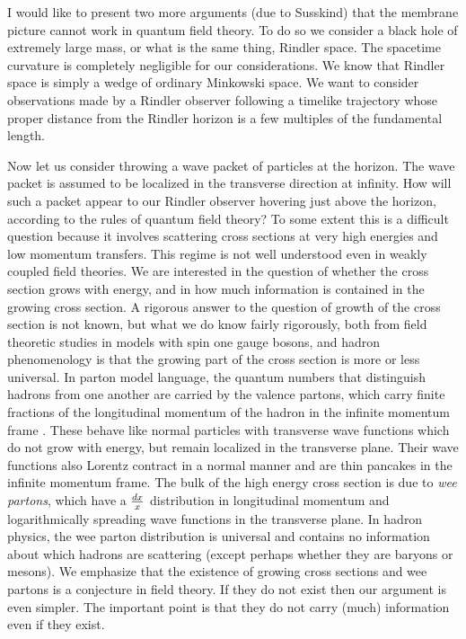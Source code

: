 I would like to present two more
arguments (due to Susskind) that the membrane picture cannot work in quantum
field
theory.  To do so we consider a black hole of extremely large mass, or what is
the same thing, Rindler space.  The spacetime curvature is completely
negligible for
our considerations.  We know that Rindler space is simply a wedge of ordinary
Minkowski space.  We want to consider observations made by a Rindler observer
following
a timelike trajectory whose proper distance from the Rindler horizon is a few
multiples of
the fundamental length.

Now let us consider throwing a wave packet of particles at the horizon.  The
wave packet
is assumed to be localized in the transverse direction at infinity.  How will
such a packet
appear to our Rindler observer hovering just above the horizon, according to
the rules of
quantum field theory?  To some extent this is a difficult question because it
involves
scattering cross sections at very high energies and low momentum transfers.
This
regime is not well understood even in weakly coupled field theories.
We are interested
in the question of whether the cross section grows with energy, and in how
much information
is contained in the growing cross section.  A rigorous answer to the question
of
growth of the cross section is not known, but what we do know fairly
rigorously, both from
field theoretic studies in models with spin one gauge bosons,
and hadron phenomenology is that the growing part of the cross section is more or
less
universal.  In parton model language, the quantum numbers that distinguish
hadrons from
one another are carried by the valence partons, which carry finite fractions
of the longitudinal momentum of the hadron in the infinite momentum frame
.
These behave like normal
particles with transverse wave functions which do not grow with energy, but
remain localized in the
transverse plane.  Their wave functions also Lorentz contract in a normal
manner and are thin pancakes
in the infinite momentum frame. The bulk of the high energy cross section is
due to {\it wee partons}, which have
a ${dx\over x}$ distribution in longitudinal momentum and logarithmically
spreading wave functions
in the transverse plane.  In hadron physics, the wee parton distribution is
universal and contains
no information about which hadrons are scattering (except perhaps whether
they are baryons or mesons).
We emphasize that the existence of growing cross sections and wee partons is
a conjecture in field theory.
If they do not exist then our argument is even simpler.  The important point
is that they do not carry
(much) information even if they exist.

